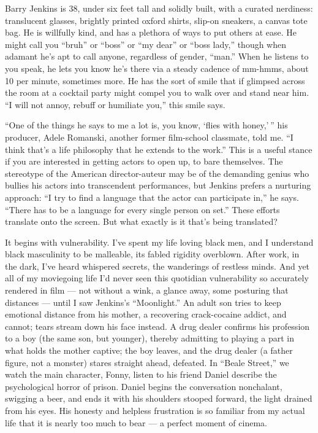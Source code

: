 Barry Jenkins is 38, under six feet tall and solidly built, with a
curated nerdiness: translucent glasses, brightly printed oxford shirts,
slip-on sneakers, a canvas tote bag. He is willfully kind, and has a
plethora of ways to put others at ease. He might call you ``bruh'' or
``boss'' or ``my dear'' or ``boss lady,'' though when adamant he's apt
to call anyone, regardless of gender, ``man.'' When he listens to you
speak, he lets you know he's there via a steady cadence of mm-hmms,
about 10 per minute, sometimes more. He has the sort of smile that if
glimpsed across the room at a cocktail party might compel you to walk
over and stand near him. ``I will not annoy, rebuff or humiliate you,''
this smile says.

``One of the things he says to me a lot is, you know, `flies with
honey,' '' his producer, Adele Romanski, another former film-school
classmate, told me. ``I think that's a life philosophy that he extends
to the work.'' This is a useful stance if you are interested in getting
actors to open up, to bare themselves. The stereotype of the American
director-auteur may be of the demanding genius who bullies his actors
into transcendent performances, but Jenkins prefers a nurturing
approach: ``I try to find a language that the actor can participate
in,'' he says. ``There has to be a language for every single person on
set.'' These efforts translate onto the screen. But what exactly is it
that's being translated?

It begins with vulnerability. I've spent my life loving black men, and I
understand black masculinity to be malleable, its fabled rigidity
overblown. After work, in the dark, I've heard whispered secrets, the
wanderings of restless minds. And yet all of my moviegoing life I'd
never seen this quotidian vulnerability so accurately rendered in film
--- not without a wink, a glance away, some posturing that distances ---
until I saw Jenkins's ``Moonlight.'' An adult son tries to keep
emotional distance from his mother, a recovering crack-cocaine addict,
and cannot; tears stream down his face instead. A drug dealer confirms
his profession to a boy (the same son, but younger), thereby admitting
to playing a part in what holds the mother captive; the boy leaves, and
the drug dealer (a father figure, not a monster) stares straight ahead,
defeated. In ``Beale Street,'' we watch the main character, Fonny,
listen to his friend Daniel describe the psychological horror of prison.
Daniel begins the conversation nonchalant, swigging a beer, and ends it
with his shoulders stooped forward, the light drained from his eyes. His
honesty and helpless frustration is so familiar from my actual life that
it is nearly too much to bear --- a perfect moment of cinema.

